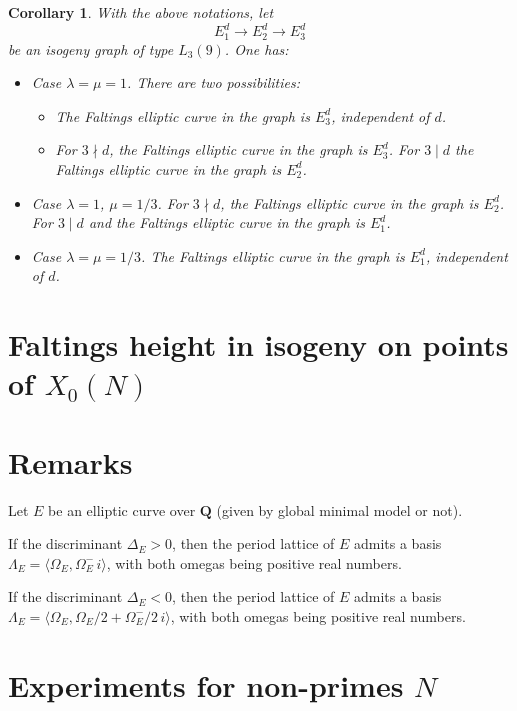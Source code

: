 \documentclass[
  journal=small,
  manuscript=article-type,  %
  year=2020,
  volume=37,
]{cup-journal}
\newtheorem{cor}{Corollary}
\begin{document}
{
\begin{cor}
With the above notations, let
$$
E_1^d \longrightarrow E_2^d \longrightarrow E_3^d
$$
be an isogeny graph of type $L_3(9)$. One has:

\begin{itemize}
    \item[(i)] Case $\lambda=\mu=1$. There are two possibilities:
    \begin{itemize}
    \item[$\bullet$] The Faltings elliptic curve in the graph is $E_3^d$, independent of $d$.
    \item[$\bullet$] For $3\nmid d$, 
    the Faltings elliptic curve in the graph is $E_3^d$.
    For $3\mid d$ the Faltings elliptic curve in the graph is $E_2^d$.
     \end{itemize}
     \item[(ii)] Case $\lambda=1$, $\mu=1/3$.    
    For $3\nmid d$, 
    the Faltings elliptic curve in the graph is $E_2^d$.
    For $3\mid d$ and 
       the Faltings elliptic curve in the graph is $E_1^d$.

 \item[(iii)] Case $\lambda=\mu=1/3$.     The Faltings elliptic curve in the graph is $E_1^d$, independent of $d$.
\end{itemize}
\end{cor}
}


\newpage
\section{Faltings height in isogeny on points of $X_0(N)$}

\section{Remarks}
Let $E$ be an elliptic curve over $\mathbf{Q}$ (given by global minimal model or not).

If the discriminant $\Delta_E>0$, then the period lattice of $E$ admits a basis $\Lambda_E=\langle \Omega_E, \Omega_E^- \, i \rangle$, with both omegas being positive real numbers.

If the discriminant  $\Delta_E<0$, then the period lattice of $E$ admits a basis $\Lambda_E=\langle \Omega_E, \Omega_E/2+\Omega_E^-/2\, i \rangle$, with both omegas being positive real numbers.


\section{Experiments for non-primes $N$ }
\end{document}
